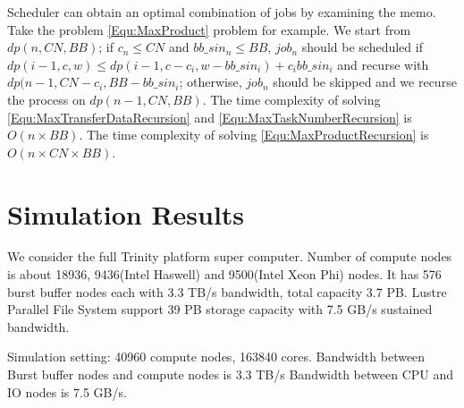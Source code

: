 \documentclass[conference,compsoc]{IEEEtran}
\begin{document}
Scheduler can obtain an optimal combination of jobs by examining the memo.
Take the problem \ref{Equ:MaxProduct} problem for example.
We start from $dp(n, CN, BB)$; if $c_n \leq CN$ and $bb\_sin_n \leq BB$, $job_n$ should be scheduled if
$dp(i-1, c, w) \leq dp(i-1, c - c_i, w-bb\_sin_i) + c_i bb\_sin_i$ and recurse with $dp(n-1, CN-c_i, BB-bb\_sin_i$;
otherwise, $job_n$ should be skipped and we recurse the process on $dp(n-1, CN, BB)$.
The time complexity of solving \ref{Equ:MaxTransferDataRecursion} and \ref{Equ:MaxTaskNumberRecursion} is $O(n\times BB)$.
The time complexity of solving \ref{Equ:MaxProductRecursion} is $O(n\times CN\times BB)$.


\section{Simulation Results}
We consider the full Trinity platform super computer.
Number of compute nodes is about 18936, 9436(Intel Haswell) and 9500(Intel Xeon Phi) nodes.
It has 576 burst buffer nodes each with 3.3 TB/s bandwidth, total capacity 3.7 PB.
Lustre Parallel File System support 39 PB storage capacity with 7.5 GB/s sustained bandwidth.

Simulation setting:
40960 compute nodes, 163840 cores.
Bandwidth between Burst buffer nodes and compute nodes is 3.3 TB/s
Bandwidth between CPU and IO nodes is 7.5 GB/s.







%
%
\end{document}
